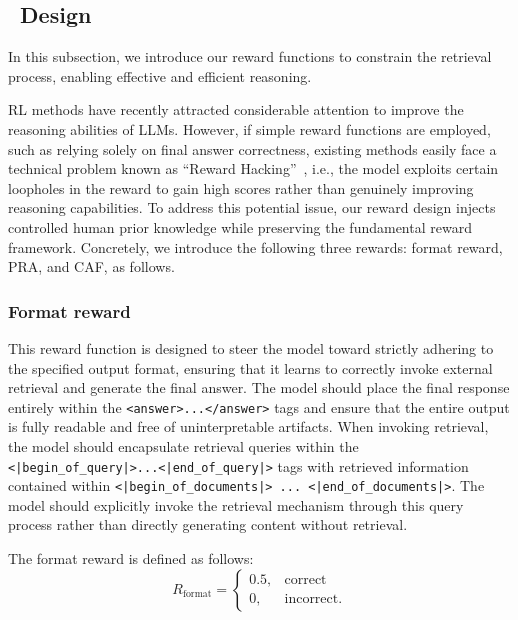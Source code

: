 \subsection{\RewardName~Design}
In this subsection, we introduce our reward functions to constrain the retrieval process, enabling effective and efficient reasoning. 

RL methods have recently attracted considerable attention to improve the reasoning abilities of LLMs. However, if simple reward functions are employed, such as relying solely on final answer correctness, existing methods easily face a technical problem known as ``Reward Hacking''~\cite{gao2023scaling}, i.e., the model exploits certain loopholes in the reward to gain high scores rather than genuinely improving reasoning capabilities. %
To address this potential issue, our reward design injects controlled human prior knowledge while preserving the fundamental reward framework. Concretely, we introduce the following three rewards: format reward, PRA, and CAF, as follows. %

\subsubsection{Format reward}

This reward function is designed to steer the model toward strictly adhering to the specified output format, ensuring that it learns to correctly invoke external retrieval and generate the final answer. The model should place the final response entirely within the \texttt{<answer>...</answer>} tags and ensure that the entire output is fully readable and free of uninterpretable artifacts. When invoking retrieval, the model should encapsulate retrieval queries within the \texttt{<|begin\_of\_query|>...<|end\_of\_query|>} tags with retrieved information contained within \texttt{<|begin\_of\_documents|> ... <|end\_of\_documents|>}. The model should explicitly invoke the retrieval mechanism through this query process rather than directly generating content without retrieval. 

The format reward is defined as follows:
\begin{equation}\label{eq:formatreward}
  R_{\text{format}} = 
  \begin{cases} 
  0.5, & \text{correct} \\
  0,   & \text{incorrect}.
  \end{cases}
  \end{equation}

